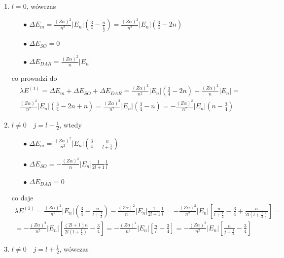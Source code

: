 \documentclass[a4paper,12pt]{article}
\begin{document}
		 \begin{enumerate}
		 	\item $l = 0$, wówczas
		 		\begin{itemize}
		 			\item[$\bullet$] $\Delta E_m = \frac{(Z\alpha)^2}{n^2}|E_n|\left(\frac{3}{4}  -\frac{n}{\frac{1}{2}} \right) =\frac{(Z\alpha)^2}{n^2}|E_n|\left(\frac{3}{4} -2n \right) $
		 			\item[$\bullet$] $\Delta E_{SO} = 0$
		 			\item[$\bullet$] $\Delta E_{DAR} = \frac{(Z\alpha)^2}{n}|E_n| $
		 		\end{itemize}
	 			co prowadzi do 
	 			$$
	 			\begin{gathered}
		 			\lambda E^{(1)} = \Delta E_m + \Delta E_{SO} + \Delta E_{DAR} = \frac{(Z\alpha)^2}{n^2}|E_n|\left(\frac{3}{4} -2n \right) + \frac{(Z\alpha)^2}{n}|E_n| = \\
		 			\frac{(Z\alpha)^2}{n^2}|E_n| \left(\frac{3}{4} -2n + n \right) = \frac{(Z\alpha)^2}{n^2}|E_n| \left(\frac{3}{4} -n  \right) = -\frac{(Z\alpha)^2}{n^2}|E_n| \left(n-\frac{3}{4}   \right)
	 			\end{gathered}
	 			$$
	 		\item $l\neq 0\quad j = l - \frac{1}{2}$, wtedy 
	 				\begin{itemize}
	 					\item[$\bullet$] $\Delta E_m = \frac{(Z\alpha)^2}{n^2}|E_n|\left(\frac{3}{4}  -\frac{n}{l+\frac{1}{2}} \right) $
	 					\item[$\bullet$] $\Delta E_{SO} = -\frac{(Z\alpha)^2}{n}|E_n|\frac{1}{2l+1}\frac{1}{l} $
	 					\item[$\bullet$] $\Delta E_{DAR} = 0  $
	 				\end{itemize}
 				co daje
 				$$
 				\begin{gathered}
 					\lambda E^{(1)} = \frac{(Z\alpha)^2}{n^2}|E_n|\left(\frac{3}{4}  -\frac{n}{l+\frac{1}{2}} \right) - \frac{(Z\alpha)^2}{n}|E_n|\frac{1}{2l+1}\frac{1}{l} =
 					-\frac{(Z\alpha)^2}{n^2}|E_n|\left[  \frac{n}{l+\frac{1}{2}}  - \frac{3}{4} + \frac{n}{2l(l+\frac{1}{2})}   \right] =\\
 					=-\frac{(Z\alpha)^2}{n^2}|E_n|\left[ \frac{(2l+1)n}{2l(l+\frac{1}{2})} - \frac{3}{4}\right] = -\frac{(Z\alpha)^2}{n^2}|E_n|\left[ \frac{n}{l} - \frac{3}{4}\right] 
 					= -\frac{(Z\alpha)^2}{n^2}|E_n|\left[ \frac{n}{j+\frac{1}{2}} - \frac{3}{4}\right] 
 				\end{gathered}
 				$$
 			\item $ l\neq 0\quad j = l + \frac{1}{2}$, wówczas

\end{enumerate}
\end{document}
